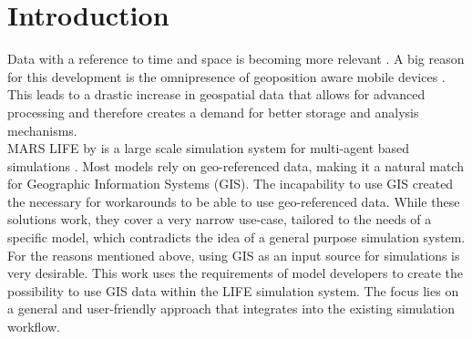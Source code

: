 

\chapter{Introduction}
Data with a reference to time and space is becoming more relevant \citep{Lee2015, Kitchin2013, Graham2013}. A big reason for this development is the omnipresence of geoposition aware mobile devices \citep{Lee2015}. This leads to a drastic increase in geospatial data that allows for advanced processing and therefore creates a demand for better storage and analysis mechanisms.\\
MARS LIFE by \cite{Huning2016} is a large scale simulation system for multi-agent based simulations \cite{Wooldridge2009}. Most models rely on geo-referenced data, making it a natural match for Geographic Information Systems (GIS).
The incapability to use GIS created the necessary for workarounds to be able to use geo-referenced data. While these solutions work, they cover a very narrow use-case, tailored to the needs of a specific model, which contradicts the idea of a general purpose simulation system.\\
For the reasons mentioned above, using GIS as an input source for simulations is very desirable. This work uses the requirements of model developers to create the possibility to use GIS data within the LIFE simulation system. The focus lies on a general and user-friendly approach that integrates into the existing simulation workflow.


